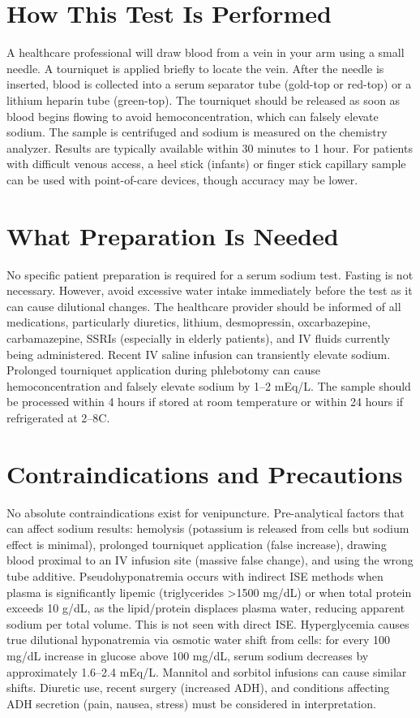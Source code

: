 \section*{How This Test Is Performed}
A healthcare professional will draw blood from a vein in your arm using a small needle. A tourniquet is applied briefly to locate the vein. After the needle is inserted, blood is collected into a serum separator tube (gold-top or red-top) or a lithium heparin tube (green-top). The tourniquet should be released as soon as blood begins flowing to avoid hemoconcentration, which can falsely elevate sodium. The sample is centrifuged and sodium is measured on the chemistry analyzer. Results are typically available within 30 minutes to 1 hour. For patients with difficult venous access, a heel stick (infants) or finger stick capillary sample can be used with point-of-care devices, though accuracy may be lower.

\section*{What Preparation Is Needed}
No specific patient preparation is required for a serum sodium test. Fasting is not necessary. However, avoid excessive water intake immediately before the test as it can cause dilutional changes. The healthcare provider should be informed of all medications, particularly diuretics, lithium, desmopressin, oxcarbazepine, carbamazepine, SSRIs (especially in elderly patients), and IV fluids currently being administered. Recent IV saline infusion can transiently elevate sodium. Prolonged tourniquet application during phlebotomy can cause hemoconcentration and falsely elevate sodium by 1--2 mEq/L. The sample should be processed within 4 hours if stored at room temperature or within 24 hours if refrigerated at 2--8\textdegree C.

\section*{Contraindications and Precautions}
No absolute contraindications exist for venipuncture. Pre-analytical factors that can affect sodium results: hemolysis (potassium is released from cells but sodium effect is minimal), prolonged tourniquet application (false increase), drawing blood proximal to an IV infusion site (massive false change), and using the wrong tube additive. Pseudohyponatremia occurs with indirect ISE methods when plasma is significantly lipemic (triglycerides >1500 mg/dL) or when total protein exceeds 10 g/dL, as the lipid/protein displaces plasma water, reducing apparent sodium per total volume. This is not seen with direct ISE. Hyperglycemia causes true dilutional hyponatremia via osmotic water shift from cells: for every 100 mg/dL increase in glucose above 100 mg/dL, serum sodium decreases by approximately 1.6--2.4 mEq/L. Mannitol and sorbitol infusions can cause similar shifts. Diuretic use, recent surgery (increased ADH), and conditions affecting ADH secretion (pain, nausea, stress) must be considered in interpretation.

